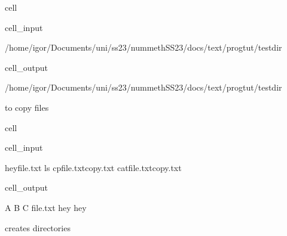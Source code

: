 \documentclass[a4paper,10pt,english]{jupyterBook}
\begin{document}
\begin{sphinxuseclass}{cell}\begin{sphinxVerbatimInput}

\begin{sphinxuseclass}{cell_input}
\begin{sphinxVerbatim}[commandchars=\\\{\}]
/home/igor/Documents/uni/ss23/nummethSS23/docs/text/progtut/testdir
\end{sphinxVerbatim}

\end{sphinxuseclass}\end{sphinxVerbatimInput}
\begin{sphinxVerbatimOutput}

\begin{sphinxuseclass}{cell_output}
\begin{sphinxVerbatim}[commandchars=\\\{\}]
/home/igor/Documents/uni/ss23/nummethSS23/docs/text/progtut/testdir
\end{sphinxVerbatim}

\end{sphinxuseclass}\end{sphinxVerbatimOutput}

\end{sphinxuseclass}
\sphinxAtStartPar
{} to copy files

\begin{sphinxuseclass}{cell}\begin{sphinxVerbatimInput}

\begin{sphinxuseclass}{cell_input}
\begin{sphinxVerbatim}[commandchars=\\\{\}]
hey\PYGZgt{}file.txt
ls
cpfile.txtcopy.txt
catfile.txtcopy.txt
\end{sphinxVerbatim}

\end{sphinxuseclass}\end{sphinxVerbatimInput}
\begin{sphinxVerbatimOutput}

\begin{sphinxuseclass}{cell_output}
\begin{sphinxVerbatim}[commandchars=\\\{\}]
A  B  C  file.txt
hey
hey
\end{sphinxVerbatim}

\end{sphinxuseclass}\end{sphinxVerbatimOutput}

\end{sphinxuseclass}
\sphinxAtStartPar
{} creates directories
\end{document}
